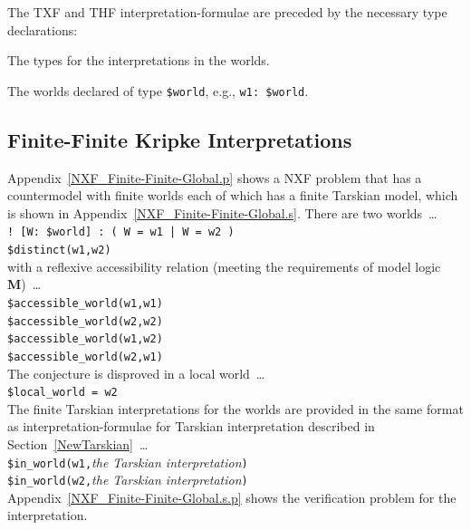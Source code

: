 \documentclass{easychair}
\newcommand{\smalltt}[1]{\small \texttt{#1}}
\newenvironment{packed_itemize}{
\vspace*{-0.3em}
\begin{itemize}
\setlength{\partopsep}{0pt}
\setlength{\itemsep}{1pt}
\setlength{\parskip}{0pt}
\setlength{\parsep}{0pt}
}{\end{itemize}}
\begin{document}
\vspace*{0.5em}
The TXF and THF interpretation-formulae are preceded by the necessary type declarations:
\begin{packed_itemize}
\item The types for the interpretations in the worlds.
\item The worlds declared of type {\tt \$world}, e.g., {\tt w1: \$world}.
\end{packed_itemize}

\subsection{Finite-Finite Kripke Interpretations}
\label{NewKripkeFiniteFinite}

Appendix~\ref{NXF_Finite-Finite-Global.p} shows a NXF problem that has a countermodel with
finite worlds each of which has a finite Tarskian model, which is shown in
Appendix~\ref{NXF_Finite-Finite-Global.s}.
There are two worlds~\ldots \\
\hspace*{0.5cm}\smalltt{! [W: \$world] : ( W = w1 | W = w2 )} \\
\hspace*{0.5cm}\smalltt{\$distinct(w1,w2)} \\
with a reflexive accessibility relation (meeting the requirements of model logic {\bf M})~\ldots \\
\hspace*{0.5cm}\smalltt{\$accessible\_world(w1,w1)} \\
\hspace*{0.5cm}\smalltt{\$accessible\_world(w2,w2)} \\
\hspace*{0.5cm}\smalltt{\$accessible\_world(w1,w2)} \\
\hspace*{0.5cm}\smalltt{\$accessible\_world(w2,w1)} \\
The conjecture is disproved in a local world~\ldots \\
\hspace*{0.5cm}\smalltt{\$local\_world = w2} \\
The finite Tarskian interpretations for the worlds are provided in the same format as
interpretation-formulae for Tarskian interpretation described in Section~\ref{NewTarskian}~\ldots \\
\hspace*{0.5cm}\smalltt{\$in\_world(w1,}{\em the Tarskian interpretation}{\tt )} \\
\hspace*{0.5cm}\smalltt{\$in\_world(w2,}{\em the Tarskian interpretation}{\tt )} \\
Appendix~\ref{NXF_Finite-Finite-Global.s.p} shows the verification problem for the interpretation.
\end{document}
